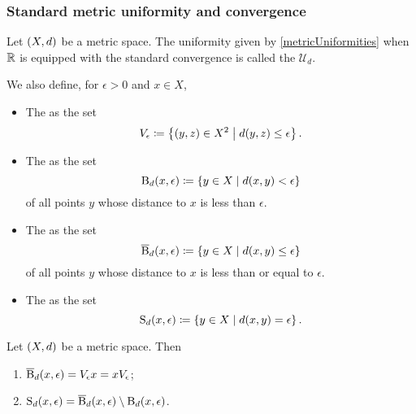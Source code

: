 \subsubsection{Standard metric uniformity and convergence}
\begin{definition}
Let $\left( X,d \right)$ be a metric space. The uniformity given by \ref{metricUniformities} when $\mathbb{R}$ is equipped with the standard convergence is called the  $\mathcal{U}_d$.

We also define, for $\epsilon >0$ and $x\in X$,
\begin{itemize}
\item The  as the set
\[ V_\epsilon \coloneqq \left\{ (y,z)\in X^2 \;\middle|\; d(y,z)\leq \epsilon \right\}. \]
\item The  as the set
\[ \operatorname{B}_d(x,\epsilon) \coloneqq \left\{ y\in X \;\middle|\; d(x,y)< \epsilon \right\} \]
of all points $y$ whose distance to $x$ is less than $\epsilon$.
\item The  as the set
\[ \operatorname{\overline{B}}_d(x,\epsilon) \coloneqq \left\{ y\in X \;\middle|\; d(x,y)\leq \epsilon \right\} \]
of all points $y$ whose distance to $x$ is less than or equal to $\epsilon$.
\item The  as the set
\[ \operatorname{S}_d(x,\epsilon) \coloneqq \left\{ y\in X \;\middle|\; d(x,y) = \epsilon \right\}. \]
\end{itemize}
\end{definition}

\begin{lemma}
Let $\left( X,d \right)$ be a metric space. Then
\begin{enumerate}
\item $\operatorname{\overline{B}}_d(x,\epsilon) = V_\epsilon x = xV_\epsilon$;
\item $\operatorname{S}_d(x,\epsilon) = \operatorname{\overline{B}}_d(x,\epsilon)\setminus \operatorname{B}_d(x,\epsilon)$.
\end{enumerate}
\end{lemma}

